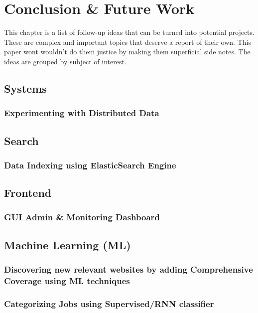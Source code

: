 \chapter{Conclusion \& Future Work}
This chapter is a list of follow-up ideas that can be turned into potential projects. These are complex and
important topics that deserve a report of their own. This paper wont wouldn't do them justice by making
them superficial side notes. The ideas are grouped by subject of interest.

\section{Systems}
\subsection{Experimenting with Distributed Data}

\section{Search}
\subsection{Data Indexing using ElasticSearch Engine}

\section{Frontend}
\subsection{GUI Admin \& Monitoring Dashboard}

\section{Machine Learning (ML)}
\subsection{Discovering new relevant websites by adding Comprehensive Coverage using ML techniques}
\subsection{Categorizing Jobs using Supervised/RNN classifier}

\pagebreak